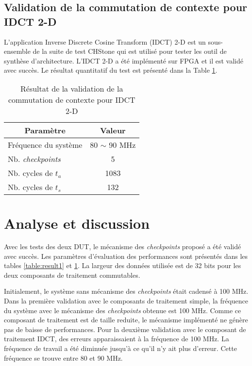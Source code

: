 \subsection{Validation de la commutation de contexte pour IDCT 2-D}

L'application Inverse Discrete Cosine Transform (\gls{IDCT}) 2-D est un sous-ensemble de la suite de test CHStone
qui est utilisé pour tester les outil de synthèse d'architecture\cite{Hara2009}. L'IDCT 2-D a été implémenté sur FPGA et
il est validé avec succès. Le résultat quantitatif du test est présenté dans la Table \ref{table:result2}.

\begin{table}[h]
	\caption{Résultat de la validation de la commutation de contexte pour IDCT 2-D}
 	\label{table:result2}
	\vspace{-2mm}
	\begin{center}
		\begin{tabular}{|l|c|}
			\hline
			\multicolumn{1}{|c|}{\cellcolor{black!30} \textbf{Paramètre}}   				& 	\multicolumn{1}{c|}{\cellcolor{black!30} \textbf{Valeur}} 	\\
			\hline
			Fréquence du système	&	80 $\sim$ 90 MHz	\\
			Nb. \emph{checkpoints}	&	5 			\\
			Nb. cycles de $t_a$		&	1083		\\
			Nb. cycles de $t_s$		&	132			\\
			\hline
		\end{tabular}
	\end{center}
	\vspace{-5mm}
\end{table}

\section{Analyse et discussion}
\label{sec:analyse}
Avec les tests des deux DUT, le mécanisme des \emph{checkpoints} proposé a été validé avec succès.
Les paramètres d'évaluation des performances sont présentés dans les tables \ref{table:result1} et \ref{table:result2}.
La largeur des données utilisée est de 32 bits pour les deux composants de traitement commutables.

Initialement, le système sans mécanisme des \emph{checkpoints} était cadensé à 100 MHz.
Dans la première validation avec le composants de traitement simple, la fréquence du système avec le mécanisme des
\emph{checkpoints} obtenue est 100 MHz. Comme ce composant de traitement est de taille reduite, le mécanisme
implémenté ne génère pas de baisse de performances.
Pour la deuxième validation avec le composant de traitement IDCT, des erreurs apparaissaient à la fréquence de 100 MHz.
La fréquence de travail a été diminuée jusqu'à ce qu'il n'y ait plus d'erreur. Cette fréquence se trouve entre 80 et 90 MHz.

